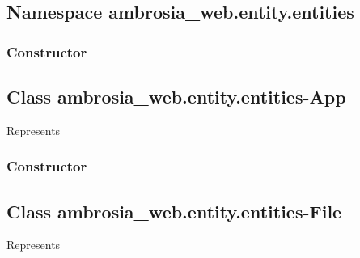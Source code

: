 \documentclass[letterpaper,10pt,english]{sphinxmanual}
\begin{document}
\subsection{Namespace ambrosia\_web.entity.entities}
\label{ambrosia_web.entity.entities:namespace-ambrosia-web-entity-entities}\label{ambrosia_web.entity.entities::doc}

\subsubsection{Constructor}
\label{ambrosia_web.entity.entities:constructor}

\begin{fulllineitems}
\label{ambrosia_web.entity.entities:ambrosia_web.entity.entities}
\end{fulllineitems}



\subsection{Class ambrosia\_web.entity.entities-App}
\label{ambrosia_web.entity.entities-App:class-ambrosia-web-entity-entities-app}\label{ambrosia_web.entity.entities-App::doc}
Represents {\hyperref[ambrosia.model:ambrosia.model.entities.App]{}}


\subsubsection{Constructor}
\label{ambrosia_web.entity.entities-App:constructor}

\begin{fulllineitems}
\label{ambrosia_web.entity.entities-App:ambrosia_web.entity.entities-App}
\end{fulllineitems}



\subsection{Class ambrosia\_web.entity.entities-File}
\label{ambrosia_web.entity.entities-File::doc}\label{ambrosia_web.entity.entities-File:class-ambrosia-web-entity-entities-file}
Represents {\hyperref[ambrosia.model:ambrosia.model.entities.File]{}}
\end{document}
